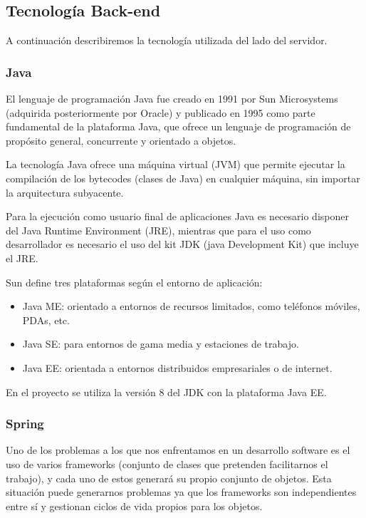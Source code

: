 \subsection{Tecnología Back-end}
A continuación describiremos la tecnología utilizada del lado del servidor.

\subsubsection{Java}

El lenguaje de programación Java fue creado en 1991 por Sun Microsystems (adquirida posteriormente por Oracle) y publicado en 1995 como parte fundamental de la plataforma Java, que ofrece un lenguaje de programación de propósito general, concurrente y orientado a objetos.

La tecnología Java ofrece una máquina virtual (JVM) que permite ejecutar la compilación de los bytecodes (clases de Java) en cualquier máquina, sin importar la arquitectura subyacente.

Para la ejecución como usuario final de aplicaciones Java es necesario disponer del Java Runtime Environment (JRE), mientras que para el uso como desarrollador es necesario el uso del kit JDK (java Development Kit) que incluye el JRE.

Sun define tres plataformas según el entorno de aplicación:
\begin{itemize}
	\item Java ME: orientado a entornos de recursos limitados, como teléfonos móviles, PDAs, etc.
	\item Java SE: para entornos de gama media y estaciones de trabajo.
	\item Java EE: orientada a entornos distribuidos empresariales o de internet.
\end{itemize}

En el proyecto se utiliza la versión 8 del JDK con la plataforma Java EE.

\subsubsection{Spring}

Uno de los problemas a los que nos enfrentamos en un desarrollo software es el uso de varios frameworks (conjunto de clases que pretenden facilitarnos el trabajo), y cada uno de estos generará su propio conjunto de objetos. Esta situación puede generarnos problemas ya que los frameworks son independientes entre sí y gestionan ciclos de vida propios para los objetos.


